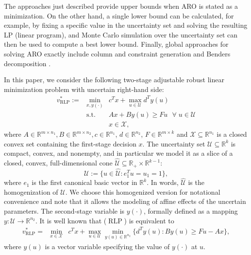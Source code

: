 \documentclass[12pt]{article}
\DeclareMathOperator{\st}{s.t.}
\DeclareMathOperator{\AR}{RLP}
\newcommand{\U}{{\mathcal{U}}}
\newcommand{\K}{\widehat{\mathcal{U}}}
\newcommand{\X}{{\mathcal{X}}}
\def\RR{{\mathbb{R}}}
\begin{document}
\begin{onehalfspace}
The approaches just described provide upper bounds when ARO is
stated as a minimization. On the other hand, a single lower bound
can be calculated, for example, by fixing a specific value in the
uncertainty set and solving the resulting LP (linear program), and Monte Carlo
simulation over the uncertainty set can then be used to compute a
best lower bound. Finally, global approaches for solving ARO exactly
include column and constraint generation \cite{Zeng.Zhao.2013} and
Benders decomposition \cite{Bertsimas.Litvinov.Sun.Zhao.Zheng.2013,
Doulabi.Jaillet.Pesant.Rousseau.2016}.

In this paper, we consider the following two-stage adjustable robust
linear minimization problem with uncertain right-hand side:
%
\begin{equation} \tag{$RLP$} \label{equ:ar}
\begin{array}{lll}
v_{\AR}^* := & \min \limits_{x,y(\cdot)} & c^Tx + \max \limits_{u \in \U} d^Ty(u) \\
         & \st & Ax + By(u) \ge Fu \ \ \ \forall \; u \in \U \\
         &     & x \in \X,
\end{array}
\end{equation}
%
where $A \in \RR^{m \times n_1}, B \in \RR^{m \times n_2}, c \in
\RR^{n_1}$, $d \in \RR^{n_2}$, $F \in \RR^{m \times k}$ and $\X
\subseteq \RR^{n_1}$ is a closed convex set containing the first-stage
decision $x$. The uncertainty set $\U \subseteq \RR^k$ is compact,
convex, and nonempty, and in particular we model it as a slice of
a closed, convex, full-dimensional cone $\K \subseteq \RR_+\times
\RR^{k-1}$:
%
\begin{equation} \label{equ:UK}
\U := \{u \in \K : e_1^Tu = u_1 = 1\},
\end{equation}
%
where $e_1$ is the first canonical basic vector in $\RR^k$. In words,
$\K$ is the homogenization of $\U$. We choose this homogenized version
for notational convenience and note that it allows the modeling of
affine effects of the uncertain parameters. The second-stage variable is
$y(\cdot)$, formally defined as a mapping $y : \U \to \RR^{n_2}$. It is
well known that ($\AR$) is equivalent to
\begin{equation} \label{equ:ar'}
\begin{array}{lll}
v_{\AR}^* = & \min \limits_{x \in \X} & c^Tx + \max \limits_{u \in \U} \min
\limits_{y(u) \in \RR^{n_2}}
\{ d^T y(u) :  By(u) \ge Fu - Ax \},
\end{array}
\end{equation}
where $y(u)$ is a vector variable specifying the value of $y(\cdot)$ at
$u$.


\end{onehalfspace}
\end{document}
